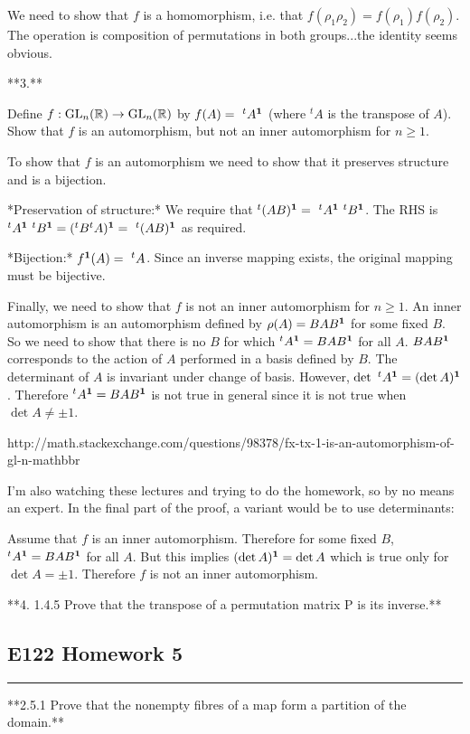 We need to show that $f$ is a homomorphism, i.e. that $f(\rho_1 \rho_2) =
f(\rho_1) f(\rho_2)$. The operation is composition of permutations in both
groups...the identity seems obvious.

**3.**

Define $f : \mathrm{GL}_n(\mathbb{R}) \rightarrow \mathrm{GL}_n(\mathbb{R})$ by $f(A) =~ ^tA^{\mathbf 1}$ (where $^tA$
is the transpose of $A$). Show that $f$ is an automorphism, but not an inner
automorphism for $n ≥ 1$.

To show that $f$ is an automorphism we need to show that it preserves structure
and is a bijection.

*Preservation of structure:* We require that $^t(AB)^{\mathbf 1} =~ ^tA^{\mathbf 1}~ ^tB^{\mathbf 1}$.
The RHS is $^tA^{\mathbf 1}~ ^tB^{\mathbf 1} = (^tB^tA)^{\mathbf 1} = ~^t(AB)^{\mathbf 1}$ as required.

*Bijection:* $f^{\mathbf 1}(A) =~ ^tA$. Since an inverse mapping exists, the original
mapping must be bijective.

Finally, we need to show that $f$ is not an inner automorphism for $n \geq
1$. An inner automorphism is an automorphism defined by $\rho(A) = BAB^{\mathbf 1}$ for
some fixed $B$. So we need to show that there is no $B$ for which $^tA^{\mathbf 1} =
BAB^{\mathbf 1}$ for all $A$. $BAB^{\mathbf 1}$ corresponds to the action of $A$ performed in a
basis defined by $B$. The determinant of $A$ is invariant under change of
basis. However, $\det ~^tA^{\mathbf 1} = (\det A)^{\mathbf 1}$. Therefore $^tA^{\mathbf 1} = BAB^{\mathbf 1}$ is
not true in general since it is not true when $\det A \neq \pm 1$.

http://math.stackexchange.com/questions/98378/fx-tx-1-is-an-automorphism-of-gl-n-mathbbr

I'm also watching these lectures and trying to do the homework, so by no means
an expert. In the final part of the proof, a variant would be to use
determinants:

Assume that $f$ is an inner automorphism. Therefore for some fixed $B$, $^tA^{\mathbf 1}
= BAB^{\mathbf 1}$ for all $A$. But this implies $(\det A)^{\mathbf 1} = \det A$ which is true
only for $\det A = \pm 1$. Therefore $f$ is not an inner automorphism.


**4. 1.4.5 Prove that the transpose of a permutation matrix P is its inverse.**

\subsection{E122 Homework 5}
\hrule

**2.5.1 Prove that the nonempty fibres of a map form a partition of the domain.**

